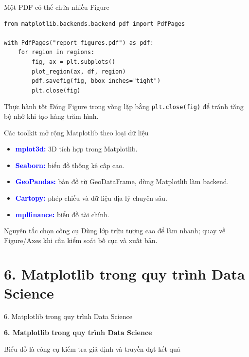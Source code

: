 \documentclass[aspectratio=169,12pt]{beamer}
\newcommand{\key}[1]{\textcolor{Blue}{\textbf{#1}}}
\newenvironment{tightitems}{\begin{itemize}\setlength\itemsep{5pt}}{\end{itemize}}
\newcommand{\SectionSlide}[2]{
\section{#1}
\begin{frame}{#1}
  \vfill
  \centering
  {\usebeamercolor[fg]{structure}\fontsize{24}{29}\selectfont\bfseries #1\par}
  \vspace{5mm}
  {\large #2\par}
  \vfill
\end{frame}}
\begin{document}
\begin{frame}[fragile]{Một PDF có thể chứa nhiều Figure}
\begin{lstlisting}[style=py]
from matplotlib.backends.backend_pdf import PdfPages

with PdfPages("report_figures.pdf") as pdf:
    for region in regions:
        fig, ax = plt.subplots()
        plot_region(ax, df, region)
        pdf.savefig(fig, bbox_inches="tight")
        plt.close(fig)
\end{lstlisting}
\begin{block}{Thực hành tốt}
Đóng Figure trong vòng lặp bằng \texttt{plt.close(fig)} để tránh tăng bộ nhớ khi tạo hàng trăm hình.
\end{block}
\end{frame}

\begin{frame}{Các toolkit mở rộng Matplotlib theo loại dữ liệu}
\begin{tightitems}
  \item \key{mplot3d:} 3D tích hợp trong Matplotlib.
  \item \key{Seaborn:} biểu đồ thống kê cấp cao.
  \item \key{GeoPandas:} bản đồ từ GeoDataFrame, dùng Matplotlib làm backend.
  \item \key{Cartopy:} phép chiếu và dữ liệu địa lý chuyên sâu.
  \item \key{mplfinance:} biểu đồ tài chính.
\end{tightitems}
\begin{block}{Nguyên tắc chọn công cụ}
Dùng lớp trừu tượng cao để làm nhanh; quay về Figure/Axes khi cần kiểm soát bố cục và xuất bản.
\end{block}
\end{frame}

\SectionSlide{6. Matplotlib trong quy trình Data Science}{Biểu đồ là công cụ kiểm tra giả định và truyền đạt kết quả}
\end{document}
